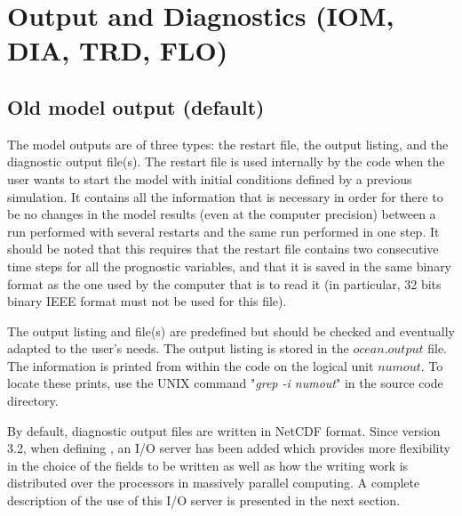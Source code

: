 \documentclass[../main/NEMO_manual]{subfiles}
\begin{document}
\chapter{Output and Diagnostics (IOM, DIA, TRD, FLO)}
\label{chap:DIA}

\minitoc

\newpage

\section{Old model output (default)}
\label{sec:DIA_io_old}

The model outputs are of three types: the restart file, the output listing, and the diagnostic output file(s).
The restart file is used internally by the code when the user wants to start the model with
initial conditions defined by a previous simulation.
It contains all the information that is necessary in order for there to be no changes in the model results
(even at the computer precision) between a run performed with several restarts and
the same run performed in one step.
It should be noted that this requires that the restart file contains two consecutive time steps for
all the prognostic variables, and that it is saved in the same binary format as the one used by the computer that
is to read it (in particular, 32 bits binary IEEE format must not be used for this file).

The output listing and file(s) are predefined but should be checked and eventually adapted to the user's needs.
The output listing is stored in the $ocean.output$ file.
The information is printed from within the code on the logical unit $numout$.
To locate these prints, use the UNIX command "\textit{grep -i numout}" in the source code directory.

By default, diagnostic output files are written in NetCDF format.
Since version 3.2, when defining , an I/O server has been added which
provides more flexibility in the choice of the fields to be written as well as how
the writing work is distributed over the processors in massively parallel computing.
A complete description of the use of this I/O server is presented in the next section.
\end{document}
